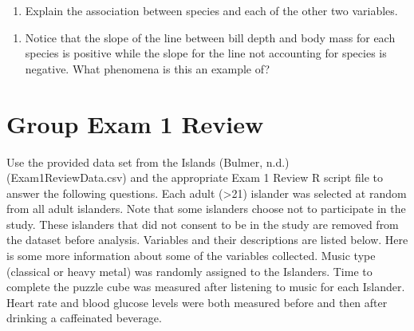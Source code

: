 \documentclass[
]{report}
\providecommand{\tightlist}{%
  \setlength{\itemsep}{0pt}\setlength{\parskip}{0pt}}
\begin{document}
\begin{enumerate}
\def\labelenumi{\arabic{enumi}.}
\setcounter{enumi}{11}
\tightlist
\item
  Explain the association between species and each of the other two variables.
\end{enumerate}

\vspace{0.5in}

\begin{enumerate}
\def\labelenumi{\arabic{enumi}.}
\setcounter{enumi}{12}
\tightlist
\item
  Notice that the slope of the line between bill depth and body mass for each species is positive while the slope for the line not accounting for species is negative. What phenomena is this an example of?
\end{enumerate}

\vspace{0.2in}

\newpage

\hypertarget{group-exam-1-review}{%
\chapter{Group Exam 1 Review}\label{group-exam-1-review}}

Use the provided data set from the Islands (Bulmer, n.d.) (Exam1ReviewData.csv) and the appropriate Exam 1 Review R script file to answer the following questions. Each adult (\textgreater21) islander was selected at random from all adult islanders. Note that some islanders choose not to participate in the study. These islanders that did not consent to be in the study are removed from the dataset before analysis. Variables and their descriptions are listed below. Here is some more information about some of the variables collected. Music type (classical or heavy metal) was randomly assigned to the Islanders. Time to complete the puzzle cube was measured after listening to music for each Islander. Heart rate and blood glucose levels were both measured before and then after drinking a caffeinated beverage.
\end{document}
